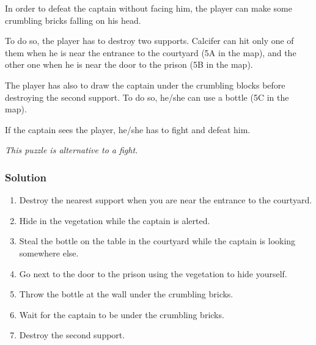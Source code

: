 In order to defeat the captain without facing him, the player can make some crumbling bricks falling on his head.

To do so, the player has to destroy two supports. Calcifer can hit only one of them when he is near the entrance to the courtyard (5A in the map), and the other one when he is near the door to the prison (5B in the map).

The player has also to draw the captain under the crumbling blocks before destroying the second support. To do so, he/she can use a bottle (5C in the map).

If the captain sees the player, he/she has to fight and defeat him.

\textit{This puzzle is alternative to a fight.}

\subsubsection*{Solution}
\begin{enumerate}
	\item Destroy the nearest support when you are near the entrance to the courtyard.
	\item Hide in the vegetation while the captain is alerted.
	\item Steal the bottle on the table in the courtyard while the captain is looking somewhere else.
	\item Go next to the door to the prison using the vegetation to hide yourself.
	\item Throw the bottle at the wall under the crumbling bricks.
	\item Wait for the captain to be under the crumbling bricks.
	\item Destroy the second support.
\end{enumerate}
